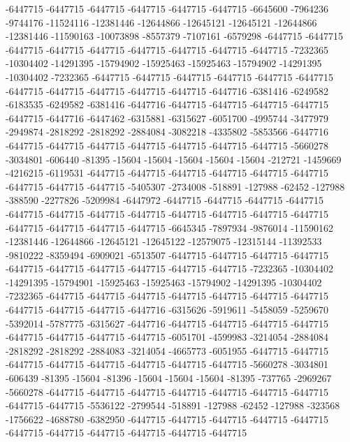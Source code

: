 -6447715 -6447715 -6447715 -6447715 -6447715 -6447715 -6645600 -7964236 -9744176 -11524116 -12381446 -12644866 -12645121 -12645121 -12644866 -12381446 -11590163 -10073898 -8557379 -7107161 -6579298 -6447715 -6447715 -6447715 -6447715 -6447715 -6447715 -6447715 -6447715 -6447715 -7232365 -10304402 -14291395 -15794902 -15925463 -15925463 -15794902 -14291395 -10304402 -7232365 -6447715 -6447715 -6447715 -6447715 -6447715 -6447715 -6447715 -6447715 -6447715 -6447715 -6447715 -6447716 -6381416 -6249582 -6183535 -6249582 -6381416 -6447716 -6447715 -6447715 -6447715 -6447715 -6447715 -6447716 -6447462 -6315881 -6315627 -6051700 -4995744 -3477979 -2949874 -2818292 -2818292 -2884084 -3082218 -4335802 -5853566 -6447716 -6447715 -6447715 -6447715 -6447715 -6447715 -6447715 -6447715 -5660278 -3034801 -606440 -81395 -15604 -15604 -15604 -15604 -15604 -212721 -1459669 -4216215 -6119531 -6447715 -6447715 -6447715 -6447715 -6447715 -6447715 -6447715 -6447715 -6447715 -5405307 -2734008 -518891 -127988 -62452 -127988 -388590 -2277826 -5209984 -6447972 -6447715 -6447715 -6447715 -6447715 -6447715 -6447715 -6447715 -6447715 -6447715 -6447715 -6447715
-6447715 -6447715 -6447715 -6447715 -6447715 -6645345 -7897934 -9876014 -11590162 -12381446 -12644866 -12645121 -12645122 -12579075 -12315144 -11392533 -9810222 -8359494 -6909021 -6513507 -6447715 -6447715 -6447715 -6447715 -6447715 -6447715 -6447715 -6447715 -6447715 -6447715 -7232365 -10304402 -14291395 -15794901 -15925463 -15925463 -15794902 -14291395 -10304402 -7232365 -6447715 -6447715 -6447715 -6447715 -6447715 -6447715 -6447715 -6447715 -6447715 -6447715 -6447716 -6315626 -5919611 -5458059 -5259670 -5392014 -5787775 -6315627 -6447716 -6447715 -6447715 -6447715 -6447715 -6447715 -6447715 -6447715 -6447715 -6051701 -4599983 -3214054 -2884084 -2818292 -2818292 -2884083 -3214054 -4665773 -6051955 -6447715 -6447715 -6447715 -6447715 -6447715 -6447715 -6447715 -6447715 -5660278 -3034801 -606439 -81395 -15604 -81396 -15604 -15604 -15604 -81395 -737765 -2969267 -5660278 -6447715 -6447715 -6447715 -6447715 -6447715 -6447715 -6447715 -6447715 -6447715 -5536122 -2799544 -518891 -127988 -62452 -127988 -323568 -1756622 -4688780 -6382950 -6447715 -6447715 -6447715 -6447715 -6447715 -6447715 -6447715 -6447715 -6447715 -6447715 -6447715
